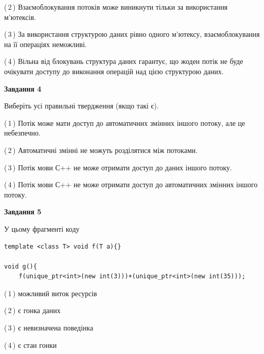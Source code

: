 \documentclass[12pt, ukrainian]{article}
\begin{document}
\begin {large}
{(\,2\,) Взаємоблокування потоків може виникнути тільки за використання м’ютексів.%

(\,3\,) За використання структурою даних рівно одного м’ютексу, взаємоблокування на її операціях неможливі.%

(\,4\,) Вільна від блокувань структура даних гарантує, що жоден потік не буде очікувати доступу до виконання операцій над цією структурою даних.%



\begin{center}
\textbf{Завдання 4}
\end{center}
Виберіть усі правильні твердження (якщо такі є).\par
\vspace{2mm}

(\,1\,) Потік може мати доступ до автоматичних змінних іншого потоку, але це небезпечно.%

(\,2\,) Автоматичні змінні не можуть розділятися між потоками.%

(\,3\,) Потік мови С++ не може отримати доступ до даних іншого потоку.%

(\,4\,) Потік мови С++ не може отримати доступ до автоматичних змінних іншого потоку.%



\begin{center}
\textbf{Завдання 5}
\end{center}
У цьому фрагменті коду
\begin{verbatim}
template <class T> void f(T a){}

void g(){
    f(unique_ptr<int>(new int(3)))+(unique_ptr<int>(new int(35)));
\end{verbatim}

(\,1\,) можливий виток ресурсів%

(\,2\,) є гонка даних%

(\,3\,) є невизначена поведінка%

(\,4\,) є стан гонки%


}
\end {large}
\end{document}
